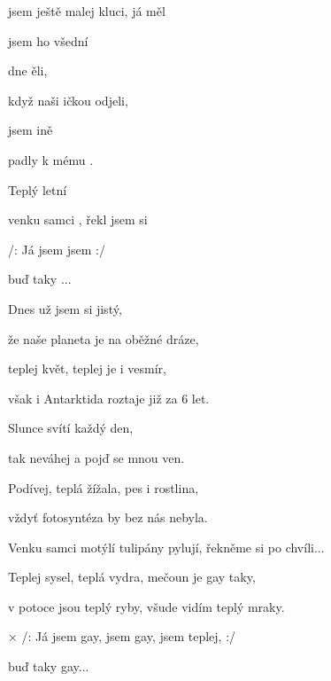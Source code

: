 

\zs
{} jsem ještě  malej 
kluci, já měl 

 jsem ho   všední 

 dne ěli,

když naši ičkou odjeli,

 jsem ině 

 padly k mému .

Teplý letní 

venku samci , řekl jsem si  
\ks

\zr
/: Já jsem  jsem   :/

buď taky ...
\kr

\zs
Dnes už jsem si jistý,

že naše planeta je na oběžné dráze,

teplej květ, teplej je i vesmír,

však i Antarktida roztaje již za 6 let.

Slunce svítí každý den,

tak neváhej a pojď se mnou ven.

Podívej, teplá žížala, pes i rostlina,

vždyť fotosyntéza by bez nás nebyla.

Venku samci motýlí tulipány pylují, řekněme si po chvíli...
\ks

\zr  \kr

\zs
Teplej sysel, teplá vydra, mečoun je gay taky,

v potoce jsou teplý ryby, všude vidím teplý mraky.
\ks

× /: Já jsem gay, jsem gay, jsem teplej, :/

buď taky gay...
\kr

\kp
